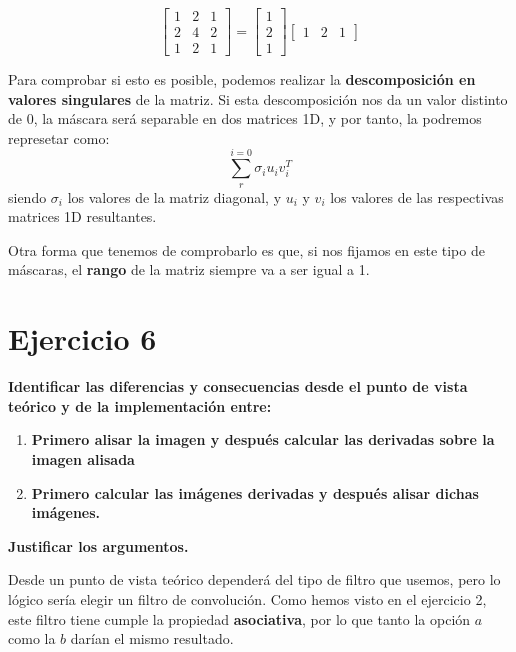 \documentclass[11pt,a4paper]{article}
\begin{document}
\begin{equation}
\begin{bmatrix}
1 & 2 & 1\\ 
2 & 4 & 2\\ 
1 & 2 & 1
\end{bmatrix}
=
\begin{bmatrix}
1\\
2\\
1
\end{bmatrix}
\begin{bmatrix}
1 & 2 & 1
\end{bmatrix}
\end{equation}


Para comprobar si esto es posible, podemos realizar la \textbf{descomposición en valores singulares} de la matriz. Si esta
descomposición nos da un valor distinto de 0, la máscara será separable en dos matrices 1D, y por tanto, la podremos represetar
como:
\begin{equation}
\sum_{r}^{i=0}\sigma_i u_i v_i^T
\end{equation}
siendo $\sigma_i$ los valores de la matriz diagonal, y $u_i$ y $v_i$ los valores de las respectivas matrices 1D resultantes.

Otra forma que tenemos de comprobarlo es que, si nos fijamos en este tipo de máscaras, el \textbf{rango} de la matriz siempre va
a ser igual a 1.


\section*{Ejercicio 6}

\textbf{Identificar las diferencias y consecuencias desde el punto de vista teórico y de la implementación entre:}
\begin{enumerate}[label=(\alph*)]
	\item \textbf{Primero alisar la imagen y después calcular las derivadas sobre la imagen alisada}
	\item \textbf{Primero calcular las imágenes derivadas y después alisar dichas imágenes.}
\end{enumerate}
\textbf{Justificar los argumentos.}

Desde un punto de vista teórico dependerá del tipo de filtro que usemos, pero lo lógico sería elegir un filtro de convolución.
Como hemos visto en el ejercicio 2, este filtro tiene cumple la propiedad \textbf{asociativa}, por lo que tanto la opción $a$ como
la $b$ darían el mismo resultado.
\end{document}
